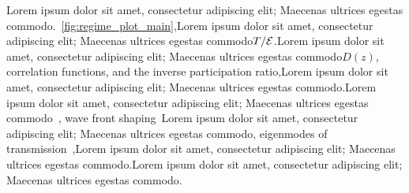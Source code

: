 

Lorem ipsum dolor sit amet, consectetur adipiscing elit; Maecenas ultrices egestas commodo.~\ref{fig:regime_plot_main},Lorem ipsum dolor sit amet, consectetur adipiscing elit; Maecenas ultrices egestas commodo$T/{\cal E}$.Lorem ipsum dolor sit amet, consectetur adipiscing elit; Maecenas ultrices egestas commodo$D(z)$, correlation functions, and the inverse participation ratio,Lorem ipsum dolor sit amet, consectetur adipiscing elit; Maecenas ultrices egestas commodo.Lorem ipsum dolor sit amet, consectetur adipiscing elit; Maecenas ultrices egestas commodo~\cite{2010_Payne_closed}, wave front shaping~\cite{2008_Vellekoop_Mosk}Lorem ipsum dolor sit amet, consectetur adipiscing elit; Maecenas ultrices egestas commodo, eigenmodes of transmission~\cite{1986_Imry},Lorem ipsum dolor sit amet, consectetur adipiscing elit; Maecenas ultrices egestas commodo.Lorem ipsum dolor sit amet, consectetur adipiscing elit; Maecenas ultrices egestas commodo.
